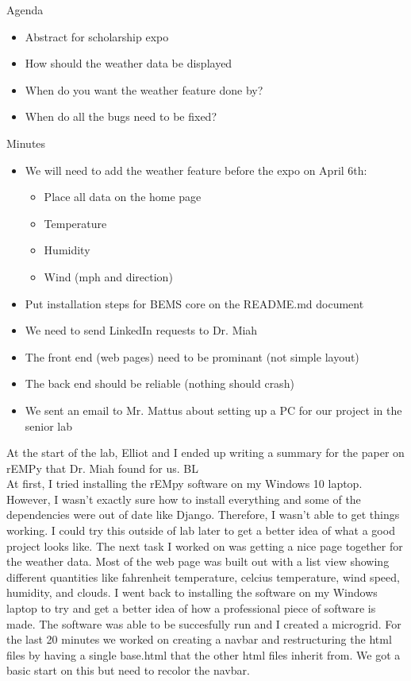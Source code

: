 \documentclass[fontsize=11pt, %
                             paper=letter, %
                             openany, %
                             captions=tableheading,
                             index=totoc,
                             hyperref]{labbook}
\begin{document}
Agenda
\begin{itemize}
\item Abstract for scholarship expo
\item How should the weather data be displayed
\item When do you want the weather feature done by?
\item When do all the bugs need to be fixed?
\end{itemize}

Minutes
\begin{itemize}
\item We will need to add the weather feature before the expo on April 6th:
    \begin{itemize}
    \item Place all data on the home page
    \item Temperature
    \item Humidity
    \item Wind (mph and direction)
    \end{itemize}
\item Put installation steps for BEMS core on the README.md document
\item We need to send LinkedIn requests to Dr. Miah
\item The front end (web pages) need to be prominant (not simple layout)
\item The back end should be reliable (nothing should crash)
\item We sent an email to Mr. Mattus about setting up a PC for our project in the senior lab
\end{itemize}

At the start of the lab, Elliot and I ended up writing a summary for the paper on rEMPy that Dr. Miah found for us. 
\medbreak\noindent
BL\\
At first, I tried installing the rEMpy software on my Windows 10 laptop. However, I wasn't exactly sure how to install everything and some of the dependencies were out of date like Django. Therefore, I wasn't able to get things working. I could try this outside of lab later to get a better idea of what a good project looks like. The next task I worked on was getting a nice page together for the weather data. Most of the web page was built out with a list view showing different quantities like fahrenheit temperature, celcius temperature, wind speed, humidity, and clouds. I went back to installing the software on my Windows laptop to try and get a better idea of how a professional piece of software is made. The software was able to be succesfully run and I created a microgrid. For the last 20 minutes we worked on creating a navbar and restructuring the html files by having a single base.html that the other html files inherit from. We got a basic start on this but need to recolor the navbar.
\end{document}
